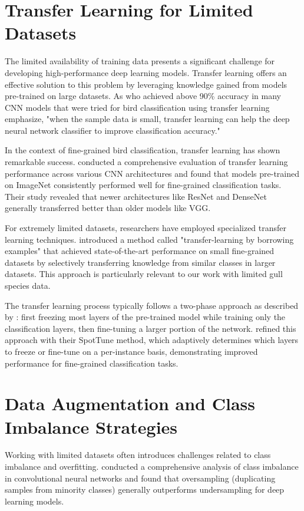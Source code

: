 \documentclass[a4paper,12pt]{article}
\begin{document}
\section*{Transfer Learning for Limited Datasets}
The limited availability of training data presents a significant challenge for developing high-performance deep learning models. Transfer learning offers an effective solution to this problem by leveraging knowledge gained from models pre-trained on large datasets. As \citep{tan2018survey} who achieved above 90\% accuracy in many CNN models that were tried for bird classification using transfer learning emphasize, "when the sample data is small, transfer learning can help the deep neural network classifier to improve classification accuracy."

In the context of fine-grained bird classification, transfer learning has shown remarkable success. \citep{kornblith2019better} conducted a comprehensive evaluation of transfer learning performance across various CNN architectures and found that models pre-trained on ImageNet consistently performed well for fine-grained classification tasks. Their study revealed that newer architectures like ResNet and DenseNet generally transferred better than older models like VGG.

For extremely limited datasets, researchers have employed specialized transfer learning techniques. \citep{cui2018large} introduced a method called "transfer-learning by borrowing examples" that achieved state-of-the-art performance on small fine-grained datasets by selectively transferring knowledge from similar classes in larger datasets. This approach is particularly relevant to our work with limited gull species data.

The transfer learning process typically follows a two-phase approach as described by \citep{sharif2014cnn}: first freezing most layers of the pre-trained model while training only the classification layers, then fine-tuning a larger portion of the network. \citep{guo2019spottune} refined this approach with their SpotTune method, which adaptively determines which layers to freeze or fine-tune on a per-instance basis, demonstrating improved performance for fine-grained classification tasks.

\section*{Data Augmentation and Class Imbalance Strategies}
Working with limited datasets often introduces challenges related to class imbalance and overfitting. \citep{buda2018systematic} conducted a comprehensive analysis of class imbalance in convolutional neural networks and found that oversampling (duplicating samples from minority classes) generally outperforms undersampling for deep learning models.
\end{document}
